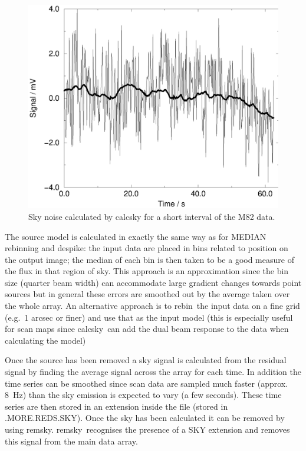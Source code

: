 \documentclass[twoside,11pt]{article}
\newcommand{\task}[1]{{\sf #1}}
\newcommand{\rebin}{\htmlref{\task{rebin}}{REBIN}}
\newcommand{\calcsky}{\htmlref{\task{calcsky}}{CALCSKY}}
\newcommand{\remsky}{\htmlref{\task{remsky}}{REMSKY}}
\newcommand{\despike}{\htmlref{\task{despike}}{DESPIKE}}
\newcommand{\htmlref}[2]{#1}
\renewcommand{\_}{\texttt{\symbol{95}}}
\begin{document}
\begin{figure}
\begin{center}
\includegraphics[width=5.0in]{sun216_scansky.eps}
\caption{Sky noise calculated by \task{calcsky} for a short interval
of the M82 data.}
\label{fig:scansky}
\end{center}
\end{figure}


The source model is calculated in exactly the same way as for MEDIAN rebinning
and \despike: the input data are placed in bins related to position on the
output image; the median of each bin is then taken to be a good measure of the
flux in that region of sky. This approach is an approximation since the bin
size (quarter beam width) can accommodate large gradient changes towards
point sources but in general these errors are smoothed out by the average
taken over the whole array. An alternative approach is to \rebin\ the input
data on a fine grid (e.g.\ 1 arcsec or finer) and use that as the input model
(this is especially useful for scan maps since \calcsky\ can add the dual
beam response to the data when calculating the model)

Once the source has been removed a sky signal is calculated from the residual
signal by finding the average signal across the array for each time. 
In addition the time series can be smoothed since scan data are sampled
much faster (approx. 8~Hz) than the sky emission is expected to vary
(a few seconds). These
time series are then stored in an extension inside the file (stored in
.MORE.REDS.SKY).  Once the sky has been calculated it can be removed by using
\remsky. \remsky\ recognises the presence of a SKY extension and removes this
signal from the main data array.
\end{document}
